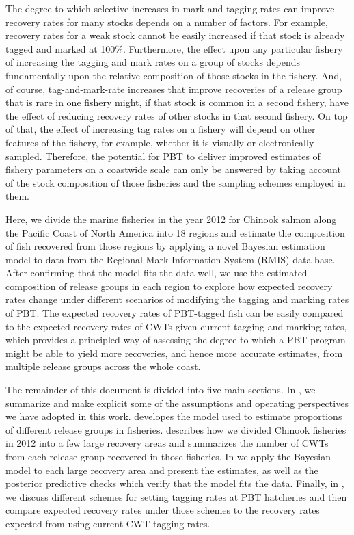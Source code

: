 \documentclass[11pt]{article}
\begin{document}
The degree to which selective increases in mark and tagging rates can improve recovery rates for many 
stocks depends on a number of factors.  For example, recovery rates for a weak stock cannot be 
easily increased if that stock is already tagged and marked at 100\%.  Furthermore,
the effect upon any particular fishery of increasing the tagging and mark rates on a group of stocks depends
fundamentally upon the relative composition of those stocks in the fishery.  And, of course,
tag-and-mark-rate increases that improve recoveries of a release group that is rare in one fishery might,
if that stock is common in a second fishery, have the effect of reducing recovery rates of other
stocks in that second fishery.  On top of that, the effect of increasing tag rates on a fishery will
depend on other features of the fishery, for example, whether it is visually or electronically sampled.
Therefore, the potential for PBT to deliver improved estimates of fishery parameters on a coastwide scale
can only be answered by taking account of the stock composition of those fisheries and the sampling
schemes employed in them.  

Here, we divide the marine fisheries in the year 2012 for Chinook salmon along
the Pacific Coast of North America into
18 regions and estimate the composition of fish recovered from those regions by applying a novel
Bayesian estimation model to data from the Regional Mark Information System (RMIS) data base.  After
confirming that the model fits the data well, we use the estimated composition of release groups
in each region to explore how expected recovery rates change under different scenarios of modifying the 
tagging and marking rates of PBT.  The expected recovery rates of PBT-tagged fish can be easily compared
to the expected recovery rates of CWTs given current tagging and marking rates, which provides a principled
way of assessing the degree to which a PBT program might be able to yield more recoveries, 
and hence more accurate estimates, from multiple release groups across the whole coast.   


The remainder of this document is divided into five main sections.  In {\sc {}},
we summarize and make explicit some of the assumptions and operating perspectives we have adopted
in this work.  {\sc {}} developes the  model used to estimate
proportions of different release groups in fisheries.  {\sc {}} describes how we divided
Chinook fisheries in 2012 into a few large recovery areas and summarizes the number of CWTs from
each release group recovered in those fisheries. In {\sc {}} we apply the
Bayesian model to each large recovery area and present the estimates, as well as the posterior
predictive checks which verify that the model fits the data.  Finally, in
{\sc{}}, we discuss different schemes for setting tagging rates at
PBT hatcheries and then compare expected recovery rates under those schemes to the recovery
rates expected from using current CWT tagging rates.  
\end{document}
